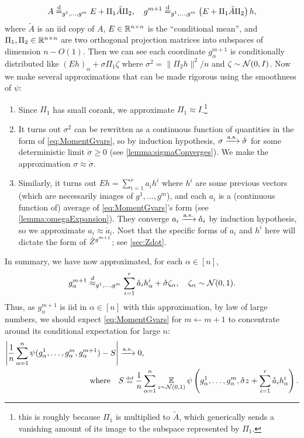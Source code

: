 \documentclass[main.tex]{subfiles}
\begin{document}
\[
A\overset{\mathrm{d}}{=}_{g^{1},\ldots,g^{m}}E+\Pi_{1}\tilde{A}\Pi_{2},\quad g^{m+1}\overset{\mathrm{d}}{=}_{g^{1},\ldots,g^{m}}\left(E+\Pi_{1}\tilde{A}\Pi_{2}\right)h,
\]
where $\tilde{A}$ is an iid copy of $A$, $E\in\mathbb{R}^{n\times n}$ is the ``conditional mean'', and $\Pi_{1},\Pi_{2}\in\mathbb{R}^{n\times n}$ are two orthogonal projection matrices into subspaces of dimension $n-O(1)$. Then we can see each coordinate $g_{\alpha}^{m+1}$ is conditionally distributed like $(Eh)_{\alpha}+\sigma\Pi_{1}\zeta$ where $\sigma^{2}=\|\Pi_{2}h\|^{2}/n$ and $\zeta\sim\mathcal{N}(0,I)$. Now we make several approximations that can be made rigorous using the smoothness of $\psi$:
\begin{enumerate}
    \item Since $\Pi_{1}$ has small corank, we approximate $\Pi_{1}\approx I$.\footnote{this is roughly because $\Pi_1$ is multiplied to $\tilde A$, which generically sends a vanishing amount of its image to the subspace represented by $\Pi_1$.} \label{item:projI}
    \item It turns out $\sigma^{2}$ can be rewritten as a continuous function of quantities in the form of \cref{eq:MomentGvars}, so by induction hypothesis, $\sigma\xrightarrow{\mathrm{a.s.}}\mathring{\sigma}$ for some deterministic limit $\mathring{\sigma}\ge0$ (see \cref{lemma:sigmaConverges}). We make the approximation $\sigma\approx\mathring{\sigma}$. \label{item:sigmaApprox}
    \item Similarly, it turns out $Eh=\sum_{i=1}^{r}a_{i}h^{i}$ where $h^{i}$ are some previous vectors (which are necessarily  images of $g^{1},\ldots,g^{m}$), and each $a_{i}$ is a (continuous function of) average of \cref{eq:MomentGvars}'s form (see \cref{lemma:omegaExpansion}). They converge $a_{i}\xrightarrow{\mathrm{a.s.}}\mathring{a}_{i}$ by induction hypothesis, so we approximate $a_{i}\approx\mathring{a}_{i}$.
    Noet that the specific forms of $a_i$ and $h^i$ here will dictate the form of $\dot Z^{g^{m+1}}$; see \cref{sec:Zdot}.
    \label{item:coefApprox}
\end{enumerate}
In summary, we have now approximated, for each $\alpha\in[n]$,
\begin{equation}
g_{\alpha}^{m+1}\overset{d}{\approx}_{g^{1},\ldots,g^{m}}\sum_{i=1}^{r}\mathring{a}_{i}h_{\alpha}^{i}+\mathring{\sigma}\zeta_{\alpha},\quad\zeta_{\alpha}\sim\Gaus(0,1).
\label{eqn:gexpansionSketch}
\end{equation}
Thus, as $g_{\alpha}^{m+1}$ is iid in $\alpha\in[n]$ with this approximation, by law of large numbers, we should expect \cref{eq:MomentGvars} for $m\gets m+1$ to concentrate around its conditional expectation for large $n$:
\begin{align*}
\left|\f 1n\sum_{\alpha=1}^{n}\psi(g_{\alpha}^{1},\ldots,g_{\alpha}^{m},g_{\alpha}^{m+1})-S\right|&\asto0,\\
\text{where}\quad &S\defeq\frac{1}{n}\sum_{\alpha=1}^{n}\EV_{z\sim\Gaus(0,1)}\psi\left(g_{\alpha}^{1},\ldots,g_{\alpha}^{m},\mathring{\sigma}z+\sum_{i=1}^{r}\mathring{a}_{i}h_{\alpha}^{i}\right).
\end{align*}
\end{document}
